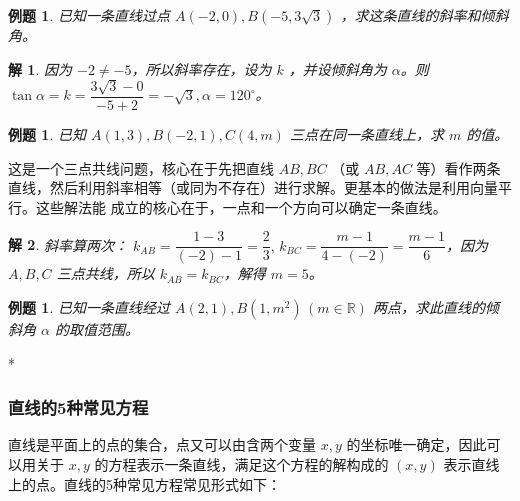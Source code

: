 \documentclass[a4paper,openany]{ctexbook}
\newcounter{examplecounter}[section]
\newtheorem{example}[examplecounter]{例题}
\newtheorem*{solution}{解}
\begin{document}
\begin{example}
    已知一条直线过点 \(A( - 2, 0),B( - 5,3 \sqrt{3})\) ，求这条直线的斜率和倾斜角。
\end{example}

\begin{solution}
    因为 \( - 2 \neq - 5\)，所以斜率存在，设为 \(k\) ，并设倾斜角为 \(\alpha\)。则
    \(\tan \alpha =k = \dfrac{3 \sqrt{3} - 0}{ - 5 + 2} = - \sqrt{3},\alpha = 120^\circ\)。
\end{solution}

\begin{example}
    已知 \(A(1,3),B( - 2,1),C(4,m)\) 三点在同一条直线上，求 \(m\) 的值。
\end{example}

这是一个三点共线问题，核心在于先把直线 \(AB,BC\) （或 \(AB,AC\) 等）看作两条直线，然后利用斜率相等（或同为不存在）进行求解。更基本的做法是利用向量平行。这些解法能
成立的核心在于，一点和一个方向可以确定一条直线。

\begin{solution}
    斜率算两次： \(k_{AB} = \dfrac{1 - 3}{( - 2) - 1} =\dfrac{2}{3},\, k_{BC} = \dfrac{m - 1}{4 -( - 2)} = \dfrac{m - 1}{6} \)，因为 \(A,B,C\) 三点共线，所以
    \(k_{AB} = k_{BC}\)，解得 \(m = 5\)。
\end{solution}

\begin{example}\label{AB含参倾斜角}
    已知一条直线经过 \(A(2,1),B(1,m^2)\, (m \in \mathbb{R} )\) 两点，求此直线的倾斜角 \(\alpha\) 的取值范围。
\end{example}

\addproof{例题 \ref{AB含参倾斜角}}{b6ac105e-b896-403e-bea1-f09d55f56e7c}{
    \(\tan \alpha = k_{AB} = \dfrac{m^2 - 1}{1 - 2} = 2 - m^2 \in ( - \infty ,1]\)，则 \(\alpha \in [0,\dfrac{\pi }{4} ]\cup(\dfrac{\pi }{2} ,\pi )\)。
}*

\subsubsection{直线的5种常见方程}

直线是平面上的点的集合，点又可以由含两个变量 \(x,y\) 的坐标唯一确定，因此可以用关于 \(x,y\) 的方程表示一条直线，满足这个方程的解构成的 \((x,y)\) 表示直线上的点。直线的5种常见方程常见形式如下：
\end{document}
